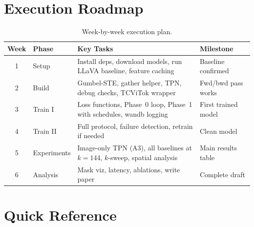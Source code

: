 \documentclass[11pt,a4paper]{article}
\begin{document}
\section{Execution Roadmap}
\label{sec:roadmap}

\begin{table}[h]
\centering
\caption{Week-by-week execution plan.}
\renewcommand{\arraystretch}{1.25}
\small
\begin{tabular}{@{}clp{6.5cm}l@{}}
  \toprule
  Week & Phase & Key Tasks & Milestone \\
  \midrule
  1 & Setup &
    Install deps, download models, run LLaVA baseline,
    feature caching &
    Baseline confirmed \\
  2 & Build &
    Gumbel-STE, gather helper, TPN, debug checks,
    TCViTok wrapper &
    Fwd/bwd pass works \\
  3 & Train I &
    Loss functions, Phase~0 loop, Phase~1 with schedules,
    wandb logging &
    First trained model \\
  4 & Train II &
    Full protocol, failure detection, retrain if needed &
    Clean model \\
  5 & Experiments &
    Image-only TPN (A3), all baselines at $k{=}144$,
    $k$-sweep, spatial analysis &
    Main results table \\
  6 & Analysis &
    Mask viz, latency, ablations, write paper &
    Complete draft \\
  \bottomrule
\end{tabular}
\end{table}

\section{Quick Reference}
\label{sec:reference}
\end{document}
